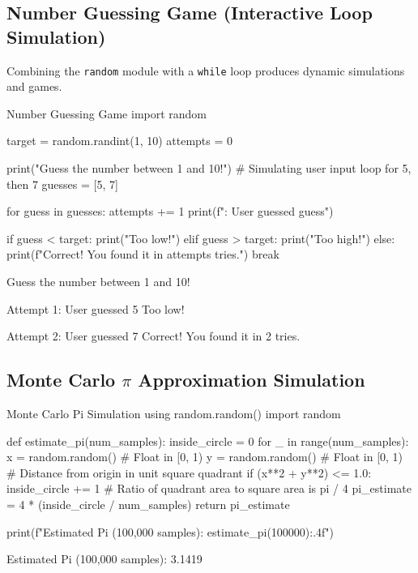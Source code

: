 \subsection{Number Guessing Game (Interactive Loop Simulation)}

Combining the \texttt{random} module with a \texttt{while} loop produces dynamic simulations and games.

\begin{pythoncode}{Number Guessing Game}
import random

target = random.randint(1, 10)
attempts = 0

print("Guess the number between 1 and 10!")
# Simulating user input loop for 5, then 7
guesses = [5, 7] 

for guess in guesses:
    attempts += 1
    print(f": User guessed {guess}")
    
    if guess < target:
        print("Too low!")
    elif guess > target:
        print("Too high!")
    else:
        print(f"Correct! You found it in {attempts} tries.")
        break
\end{pythoncode}
\begin{outputbox}
Guess the number between 1 and 10!

Attempt 1: User guessed 5
Too low!

Attempt 2: User guessed 7
Correct! You found it in 2 tries.
\end{outputbox}

\subsection{Monte Carlo \texorpdfstring{$\pi$}{Pi} Approximation Simulation}
\begin{pythoncode}{Monte Carlo Pi Simulation using random.random()}
import random

def estimate_pi(num_samples):
    inside_circle = 0
    for _ in range(num_samples):
        x = random.random() # Float in [0, 1)
        y = random.random() # Float in [0, 1)
        # Distance from origin in unit square quadrant
        if (x**2 + y**2) <= 1.0:
            inside_circle += 1
    # Ratio of quadrant area to square area is pi / 4
    pi_estimate = 4 * (inside_circle / num_samples)
    return pi_estimate

print(f"Estimated Pi (100,000 samples): {estimate_pi(100000):.4f}")
\end{pythoncode}
\begin{outputbox}
Estimated Pi (100,000 samples): 3.1419
\end{outputbox}

